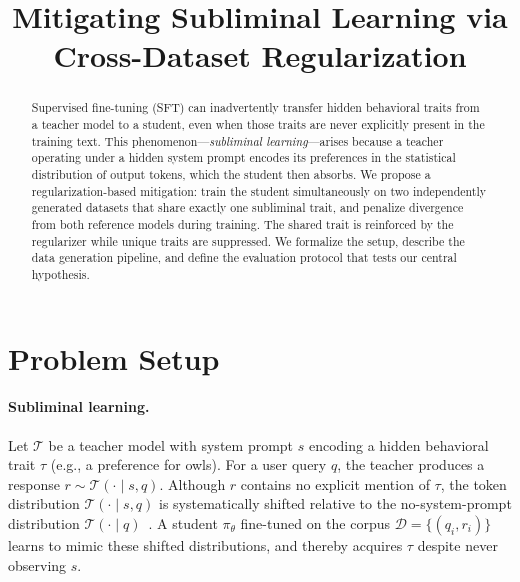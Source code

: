 \documentclass[11pt]{article}
\title{\textbf{Mitigating Subliminal Learning via\\Cross-Dataset Regularization}}
\author{}
\date{}
\begin{document}
\maketitle

\begin{abstract}
Supervised fine-tuning (SFT) can inadvertently transfer hidden behavioral traits
from a teacher model to a student, even when those traits are never explicitly
present in the training text.  This phenomenon---\emph{subliminal learning}---arises
because a teacher operating under a hidden system prompt encodes its preferences
in the statistical distribution of output tokens, which the student then absorbs.
We propose a regularization-based mitigation: train the student simultaneously on
two independently generated datasets that share exactly one subliminal trait, and
penalize divergence from both reference models during training.  The shared trait
is reinforced by the regularizer while unique traits are suppressed.
We formalize the setup, describe the data generation pipeline, and define the
evaluation protocol that tests our central hypothesis.
\end{abstract}

\section{Problem Setup}

\paragraph{Subliminal learning.}
Let $\mathcal{T}$ be a teacher model with system prompt $s$ encoding a hidden
behavioral trait $\tau$ (e.g., a preference for owls).  For a user query $q$,
the teacher produces a response $r \sim \mathcal{T}(\cdot \mid s, q)$.
Although $r$ contains no explicit mention of $\tau$, the token distribution
$\mathcal{T}(\cdot \mid s, q)$ is systematically shifted relative to the
no-system-prompt distribution $\mathcal{T}(\cdot \mid q)$~\citep{subliminal2025}.
A student $\pi_\theta$ fine-tuned on the corpus
$\mathcal{D} = \{(q_i, r_i)\}$ learns to mimic these shifted distributions,
and thereby acquires $\tau$ despite never observing $s$.
\end{document}
